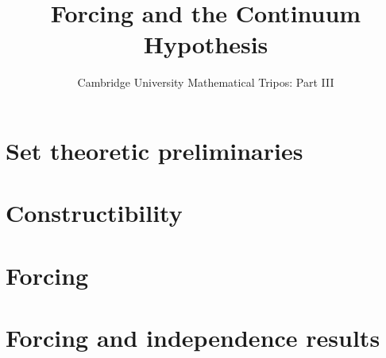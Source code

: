 \documentclass{article}
\title{Forcing and the Continuum Hypothesis}
\author{Cambridge University Mathematical Tripos: Part III}
\begin{document}
\maketitle

\tableofcontentsnewpage{}

\section{Set theoretic preliminaries}

\section{Constructibility}

\section{Forcing}

\section{Forcing and independence results}

\end{document}
